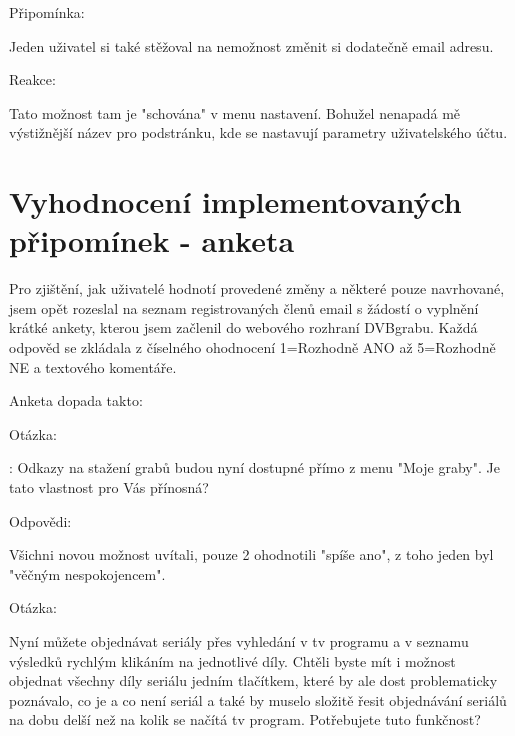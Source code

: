 \vspace{10pt}

\begin{bf}Připomínka:\end{bf} Jeden uživatel si také stěžoval na nemožnost změnit si dodatečně email adresu.

\begin{bf}Reakce:\end{bf} Tato možnost tam je "schována" v menu nastavení. Bohužel nenapadá mě výstižnější název pro podstránku, kde se nastavují parametry uživatelského účtu.

\vspace{10pt}

\section{Vyhodnocení implementovaných připomínek - anketa}

Pro zjištění, jak uživatelé hodnotí provedené změny a některé pouze navrhované, jsem opět rozeslal na seznam registrovaných členů email s žádostí o vyplnění krátké ankety, kterou jsem začlenil do webového rozhraní DVBgrabu. Každá odpověd se zkládala z číselného ohodnocení 1=Rozhodně ANO až 5=Rozhodně NE a textového komentáře.

\vspace{10pt}

Anketa dopada takto:

\vspace{10pt}

\begin{bf}Otázka:\end{bf}: Odkazy na stažení grabů budou nyní dostupné přímo z menu "Moje graby". Je tato vlastnost pro Vás přínosná?

\begin{bf}Odpovědi:\end{bf} Všichni novou možnost uvítali, pouze 2 ohodnotili "spíše ano", z toho jeden byl "věčným nespokojencem".

\vspace{10pt}

\begin{bf}Otázka:\end{bf} Nyní můžete objednávat seriály přes vyhledání v tv programu a v seznamu výsledků rychlým klikáním na jednotlivé díly. Chtěli byste mít i možnost objednat všechny díly seriálu jedním tlačítkem, které by ale dost problematicky poznávalo, co je a co není seriál a také by muselo složitě řesit objednávání seriálů na dobu delší než na kolik se načítá tv program. Potřebujete tuto funkčnost?

